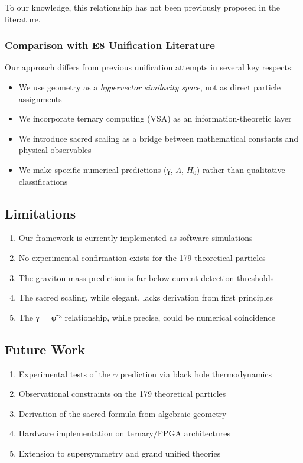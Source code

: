 \documentclass[12pt,a4paper]{article}
\begin{document}
To our knowledge, this relationship has not been previously proposed in the literature.

\subsubsection{Comparison with E8 Unification Literature}

Our approach differs from previous \Eight{} unification attempts \citep{Lisi2007} in several key respects:
\begin{itemize}
\item We use \Eeight{} geometry as a \textit{hypervector similarity space}, not as direct particle assignments
\item We incorporate ternary computing (VSA) as an information-theoretic layer
\item We introduce sacred scaling as a bridge between mathematical constants and physical observables
\item We make specific numerical predictions (γ, $\Lambda$, $H_0$) rather than qualitative classifications
\end{itemize}

\subsection{Limitations}

\begin{enumerate}
\item Our framework is currently implemented as software simulations
\item No experimental confirmation exists for the 179 theoretical particles
\item The graviton mass prediction is far below current detection thresholds
\item The sacred scaling, while elegant, lacks derivation from first principles
\item The γ = φ⁻³ relationship, while precise, could be numerical coincidence
\end{enumerate}

\subsection{Future Work}

\begin{enumerate}
\item Experimental tests of the $\gamma$ prediction via black hole thermodynamics
\item Observational constraints on the 179 theoretical particles
\item Derivation of the sacred formula from algebraic geometry
\item Hardware implementation on ternary/FPGA architectures
\item Extension to supersymmetry and grand unified theories
\end{enumerate}
\end{document}

